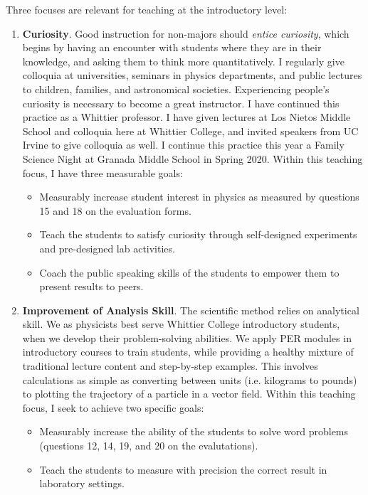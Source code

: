 \documentclass[../../main.tex]{subfiles}
\begin{document}
Three focuses are relevant for teaching at the introductory level:
\begin{enumerate}
\item \textbf{Curiosity}.  Good instruction for non-majors should \textit{entice curiosity}, which begins by having an encounter with students where they are in their knowledge, and asking them to think more quantitatively.  I regularly give colloquia at universities, seminars in physics departments, and public lectures to children, families, and astronomical societies.  Experiencing people's curiosity is necessary to become a great instructor.  I have continued this practice as a Whittier professor.  I have given lectures at Los Nietos Middle School and colloquia here at Whittier College, and invited speakers from UC Irvine to give colloquia as well.  I continue this practice this year a Family Science Night at Granada Middle School in Spring 2020.  Within this teaching focus, I have three measurable goals:

\begin{itemize}
\item Measurably increase student interest in physics as measured by questions 15 and 18 on the evaluation forms.
\item Teach the students to satisfy curiosity through self-designed experiments and pre-designed lab activities. %
\item Coach the public speaking skills of the students to empower them to present results to peers. %
\end{itemize}

\item \textbf{Improvement of Analysis Skill}.  The scientific method relies on analytical skill.  We as physicists best serve Whittier College introductory students, when we develop their problem-solving abilities.  We apply PER modules in introductory courses to train students, while providing a healthy mixture of traditional lecture content and step-by-step examples.  This involves calculations as simple as converting between units (i.e. kilograms to pounds) to plotting the trajectory of a particle in a vector field.  Within this teaching focus, I seek to achieve two specific goals:

\begin{itemize}
\item Measurably increase the ability of the students to solve word problems (questions 12, 14, 19, and 20 on the evalutations).
\item Teach the students to measure with precision the correct result in laboratory settings.
\end{itemize}


\end{enumerate}
\end{document}
